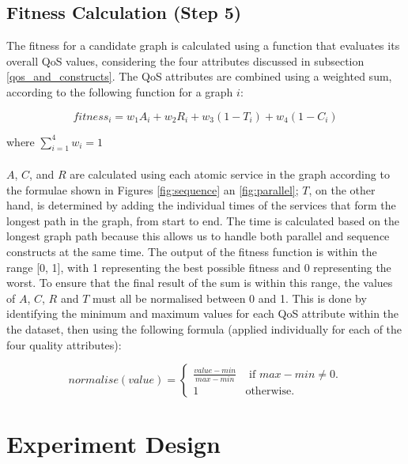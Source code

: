 \documentclass{llncs}
\begin{document}
\subsection{Fitness Calculation (Step 5)}

The fitness for a candidate graph is calculated using a function that evaluates its overall QoS values, considering the four attributes discussed in subsection \ref{qos_and_constructs}. The QoS attributes are combined using a weighted sum, according to the following function for a graph $i$:

\begin{equation}
fitness_i = w_1A_i + w_2R_i + w_3(1 - T_i) + w_4(1 - C_i)
\end{equation}

\noindent where $\sum_{i=1}^{4} w_i = 1$
\\\\
$A$, $C$, and $R$ are calculated using each atomic service in the graph according to the formulae shown in Figures \ref{fig:sequence} an \ref{fig:parallel}; $T$, on the other hand, is determined by adding the individual times of the services that form the longest path in the graph, from start to end. The time is calculated based on the longest graph path because this allows us to handle both parallel and sequence constructs at the same time. The output of the fitness function is within the range [0, 1], with 1 representing the best possible fitness and 0 representing the worst. To ensure that the final result of the sum is within this range, the values of $A$, $C$, $R$ and $T$ must all be normalised between 0 and 1. This is done by identifying the minimum and maximum values for each QoS attribute within the the dataset, then using the following formula (applied individually for each of the four quality attributes):

\begin{equation}
normalise(value) = 
\begin{cases}
	\frac{value - min}{max - min} & \text{ if }max - min \neq 0.\\
	1 & \mathrm{ otherwise}.
\end{cases}
\end{equation}

\section{Experiment Design}\label{experiment_design}
\end{document}
